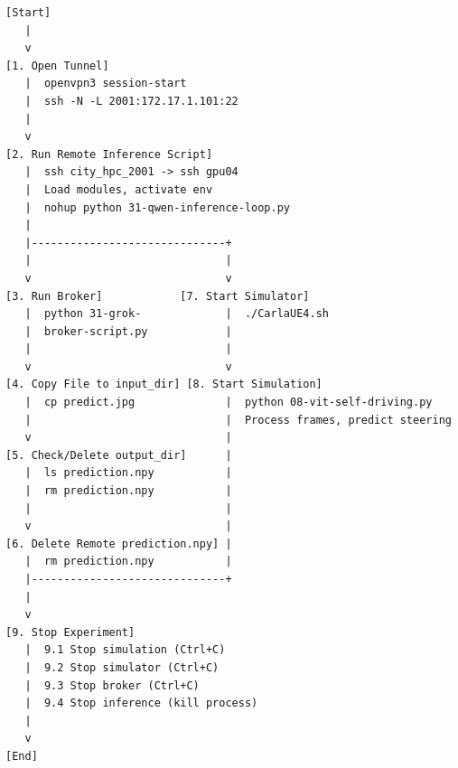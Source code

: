 \begin{verbatim}
[Start]
   |
   v
[1. Open Tunnel]
   |  openvpn3 session-start
   |  ssh -N -L 2001:172.17.1.101:22
   |
   v
[2. Run Remote Inference Script]
   |  ssh city_hpc_2001 -> ssh gpu04
   |  Load modules, activate env
   |  nohup python 31-qwen-inference-loop.py
   |
   |------------------------------+
   |                              |
   v                              v
[3. Run Broker]            [7. Start Simulator]
   |  python 31-grok-             |  ./CarlaUE4.sh
   |  broker-script.py            |
   |                              |
   v                              v
[4. Copy File to input_dir] [8. Start Simulation]
   |  cp predict.jpg              |  python 08-vit-self-driving.py
   |                              |  Process frames, predict steering
   v                              |
[5. Check/Delete output_dir]      |
   |  ls prediction.npy           |
   |  rm prediction.npy           |
   |                              |
   v                              |
[6. Delete Remote prediction.npy] |
   |  rm prediction.npy           |
   |------------------------------+
   |
   v
[9. Stop Experiment]
   |  9.1 Stop simulation (Ctrl+C)
   |  9.2 Stop simulator (Ctrl+C)
   |  9.3 Stop broker (Ctrl+C)
   |  9.4 Stop inference (kill process)
   |
   v
[End]

\end{verbatim}